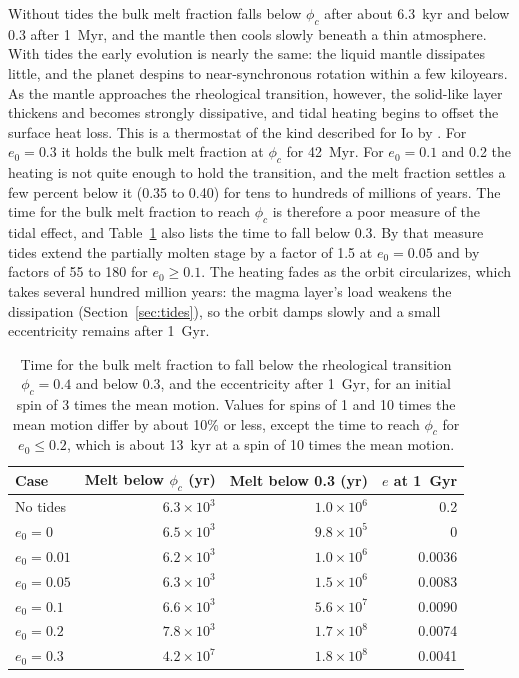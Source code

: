 \documentclass[11pt]{article}
\begin{document}
Without tides the bulk melt fraction falls below $\phi_c$ after about 6.3~kyr and below 0.3 after 1~Myr, and the mantle then cools slowly beneath a thin atmosphere. With tides the early evolution is nearly the same: the liquid mantle dissipates little, and the planet despins to near-synchronous rotation within a few kiloyears. As the mantle approaches the rheological transition, however, the solid-like layer thickens and becomes strongly dissipative, and tidal heating begins to offset the surface heat loss. This is a thermostat of the kind described for Io by \citet{Moore2003}. For $e_0 = 0.3$ it holds the bulk melt fraction at $\phi_c$ for 42~Myr. For $e_0 = 0.1$ and 0.2 the heating is not quite enough to hold the transition, and the melt fraction settles a few percent below it (0.35 to 0.40) for tens to hundreds of millions of years. The time for the bulk melt fraction to reach $\phi_c$ is therefore a poor measure of the tidal effect, and Table~\ref{tab:results} also lists the time to fall below 0.3. By that measure tides extend the partially molten stage by a factor of 1.5 at $e_0 = 0.05$ and by factors of 55 to 180 for $e_0 \ge 0.1$. The heating fades as the orbit circularizes, which takes several hundred million years: the magma layer's load weakens the dissipation (Section~\ref{sec:tides}), so the orbit damps slowly and a small eccentricity remains after 1~Gyr.

\begin{table}[h]
\centering
\caption{Time for the bulk melt fraction to fall below the rheological transition $\phi_c = 0.4$ and below 0.3, and the eccentricity after 1~Gyr, for an initial spin of 3 times the mean motion. Values for spins of 1 and 10 times the mean motion differ by about 10\% or less, except the time to reach $\phi_c$ for $e_0 \le 0.2$, which is about 13~kyr at a spin of 10 times the mean motion.}
\label{tab:results}
\begin{tabular}{lrrr}
\toprule
Case & Melt below $\phi_c$ (yr) & Melt below 0.3 (yr) & $e$ at 1~Gyr \\
\midrule
No tides & $6.3 \times 10^3$ & $1.0 \times 10^6$ & 0.2 \\
$e_0 = 0$ & $6.5 \times 10^3$ & $9.8 \times 10^5$ & 0 \\
$e_0 = 0.01$ & $6.2 \times 10^3$ & $1.0 \times 10^6$ & 0.0036 \\
$e_0 = 0.05$ & $6.3 \times 10^3$ & $1.5 \times 10^6$ & 0.0083 \\
$e_0 = 0.1$ & $6.6 \times 10^3$ & $5.6 \times 10^7$ & 0.0090 \\
$e_0 = 0.2$ & $7.8 \times 10^3$ & $1.7 \times 10^8$ & 0.0074 \\
$e_0 = 0.3$ & $4.2 \times 10^7$ & $1.8 \times 10^8$ & 0.0041 \\
\bottomrule
\end{tabular}
\end{table}
\end{document}
